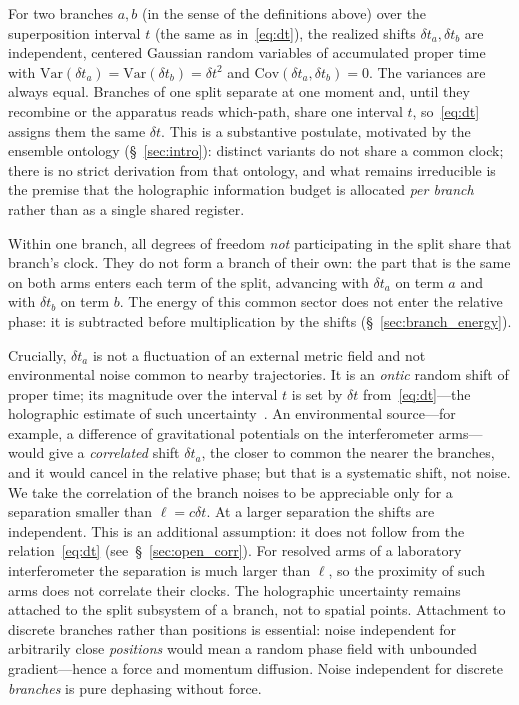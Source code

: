 \documentclass[11pt,a4paper]{article}
\begin{document}
For two branches $a,b$ (in the sense of the definitions above) over the superposition interval $t$ (the same as in~\eqref{eq:dt}), the realized shifts $\delta t_a,\delta t_b$ are independent, centered Gaussian random variables of accumulated proper time with $\mathrm{Var}(\delta t_a)=\mathrm{Var}(\delta t_b)=\delta t^2$ and $\mathrm{Cov}(\delta t_a,\delta t_b)=0$. The variances are always equal. Branches of one split separate at one moment and, until they recombine or the apparatus reads which-path, share one interval $t$, so~\eqref{eq:dt} assigns them the same $\delta t$. This is a substantive postulate, motivated by the ensemble ontology (\S~\ref{sec:intro}): distinct variants do not share a common clock; there is no strict derivation from that ontology, and what remains irreducible is the premise that the holographic information budget is allocated \emph{per branch} rather than as a single shared register.

Within one branch, all degrees of freedom \emph{not} participating in the split share that branch's clock. They do not form a branch of their own: the part that is the same on both arms enters each term of the split, advancing with $\delta t_a$ on term $a$ and with $\delta t_b$ on term $b$. The energy of this common sector does not enter the relative phase: it is subtracted before multiplication by the shifts (\S~\ref{sec:branch_energy}).

Crucially, $\delta t_a$ is not a fluctuation of an external metric field and not environmental noise common to nearby trajectories. It is an \emph{ontic} random shift of proper time; its magnitude over the interval $t$ is set by $\delta t$ from~\eqref{eq:dt}---the holographic estimate of such uncertainty~\cite{ng2005foam}. An environmental source---for example, a difference of gravitational potentials on the interferometer arms---would give a \emph{correlated} shift $\delta t_a$, the closer to common the nearer the branches, and it would cancel in the relative phase; but that is a systematic shift, not noise. We take the correlation of the branch noises to be appreciable only for a separation smaller than $\ell=c\delta t$. At a larger separation the shifts are independent. This is an additional assumption: it does not follow from the relation~\eqref{eq:dt} (see~\S~\ref{sec:open_corr}). For resolved arms of a laboratory interferometer the separation is much larger than $\ell$, so the proximity of such arms does not correlate their clocks. The holographic uncertainty remains attached to the split subsystem of a branch, not to spatial points. Attachment to discrete branches rather than positions is essential: noise independent for arbitrarily close \emph{positions} would mean a random phase field with unbounded gradient---hence a force and momentum diffusion. Noise independent for discrete \emph{branches} is pure dephasing without force.
\end{document}
